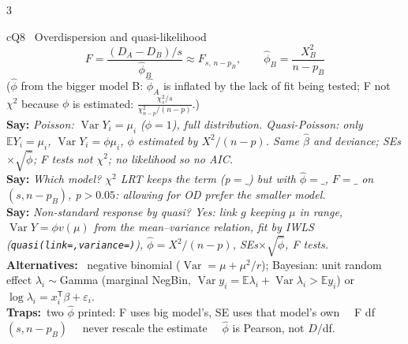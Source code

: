 \documentclass{article}
\newcommand{\h}[1]{{\bfseries #1}\ }
\newcommand{\say}[1]{{\color{cMC!75!black}\textbf{Say:}} \emph{#1}}
\newcommand{\trap}{{\color{cBay}\textbf{Traps:}}\ }
\newcommand{\E}{\mathbb E}
\newcommand{\V}{\operatorname{Var}}
\newcommand{\tsp}{^{\mathsf T}}
\newcommand{\rc}[1]{\texttt{#1}}
\newcommand{\sep}{\ \textbullet\ }
\begin{document}
\begin{multicols*}{3}
\begin{tb}{cQ}{8 \textbullet\ Overdispersion and quasi-likelihood}
\[F=\frac{(D_A-D_B)/s}{\hat\phi_B}\approx F_{s,\,n-p_B},\qquad\hat\phi_B=\frac{X^2_B}{n-p_B}\]
($\hat\phi$ from the bigger model B: $\hat\phi_A$ is inflated by the lack of fit being tested; F not $\chi^2$ because $\phi$ is estimated: $\frac{\chi^2_s/s}{\chi^2_{n-p}/(n-p)}$.)\\
\say{Poisson: $\V Y_i=\mu_i$ ($\phi=1$), full distribution. Quasi-Poisson: only $\E Y_i=\mu_i$, $\V Y_i=\phi\mu_i$, $\phi$ estimated by $X^2/(n-p)$. Same $\hat\beta$ and deviance; SEs $\times\sqrt{\hat\phi}$; F tests not $\chi^2$; no likelihood so no AIC.}\\
\say{Which model? $\chi^2$ LRT keeps the term (p$=\_$) but with $\hat\phi=\_$, $F=\_$ on $(s,n-p_B)$, p$>0.05$: allowing for OD prefer the smaller model.}\\
\say{Non-standard response by quasi? Yes: link $g$ keeping $\mu$ in range, $\V Y=\phi v(\mu)$ from the mean--variance relation, fit by IWLS (\rc{quasi(link=,variance=)}), $\hat\phi=X^2/(n-p)$, SEs$\times\sqrt{\hat\phi}$, F tests.}\\
\h{Alternatives:} negative binomial ($\V=\mu+\mu^2/r$); Bayesian: unit random effect $\lambda_i\sim$Gamma (marginal NegBin, $\V y_i=\E\lambda_i+\V\lambda_i>\E y_i$) or $\log\lambda_i=x_i\tsp\beta+\varepsilon_i$.\\
\trap two $\hat\phi$ printed: F uses big model's, SE uses that model's own \sep F df $(s,n-p_B)$ \sep never rescale the estimate \sep $\hat\phi$ is Pearson, not $D/$df.
\end{tb}


\end{multicols*}
\end{document}
